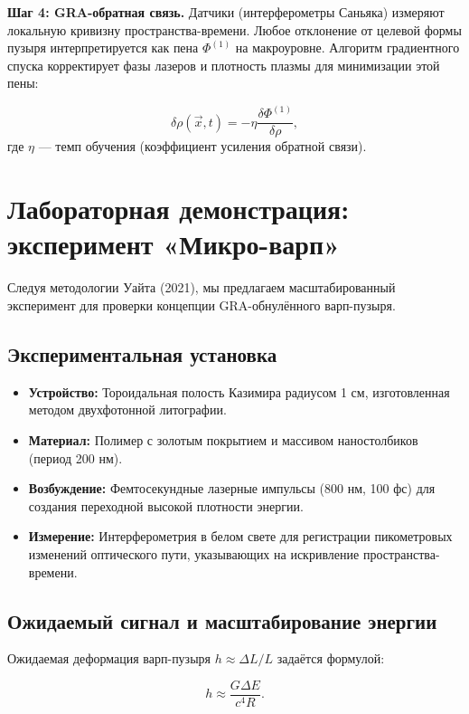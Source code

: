 \documentclass[11pt]{article}
\begin{document}
\textbf{Шаг 4: GRA-обратная связь.} Датчики (интерферометры Саньяка) измеряют локальную кривизну пространства-времени. Любое отклонение от целевой формы пузыря интерпретируется как пена $\Phi^{(1)}$ на макроуровне. Алгоритм градиентного спуска корректирует фазы лазеров и плотность плазмы для минимизации этой пены:

\begin{equation}
\delta \rho(\vec{x}, t) = -\eta \frac{\delta \Phi^{(1)}}{\delta \rho},
\label{eq:feedback}
\end{equation}
где $\eta$ — темп обучения (коэффициент усиления обратной связи).

\section{Лабораторная демонстрация: эксперимент «Микро-варп»}

Следуя методологии Уайта (2021), мы предлагаем масштабированный эксперимент для проверки концепции GRA-обнулённого варп-пузыря.

\subsection{Экспериментальная установка}
\begin{itemize}
    \item \textbf{Устройство:} Тороидальная полость Казимира радиусом 1 см, изготовленная методом двухфотонной литографии.
    \item \textbf{Материал:} Полимер с золотым покрытием и массивом наностолбиков (период 200 нм).
    \item \textbf{Возбуждение:} Фемтосекундные лазерные импульсы (800 нм, 100 фс) для создания переходной высокой плотности энергии.
    \item \textbf{Измерение:} Интерферометрия в белом свете для регистрации пикометровых изменений оптического пути, указывающих на искривление пространства-времени.
\end{itemize}

\subsection{Ожидаемый сигнал и масштабирование энергии}

Ожидаемая деформация варп-пузыря $h \approx \Delta L / L$ задаётся формулой:

\begin{equation}
h \approx \frac{G \Delta E}{c^4 R}.
\label{eq:strain}
\end{equation}
\end{document}

